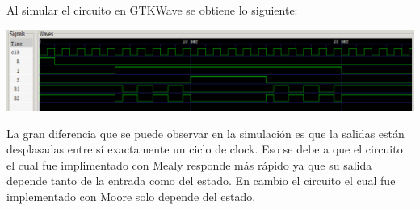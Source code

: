 Al simular el circuito en GTKWave se obtiene lo siguiente:
\begin{center}
\includegraphics[scale=0.5]{mealy2.png}
\end{center}
La gran diferencia que se puede observar en la simulación es que la salidas est\'an desplasadas entre s\'i exactamente un ciclo de clock. Eso se debe a que el circuito el cual fue implimentado con Mealy responde m\'as r\'apido ya que su salida depende tanto de la entrada como del estado. En cambio el circuito el cual fue implementado con Moore solo depende del estado.